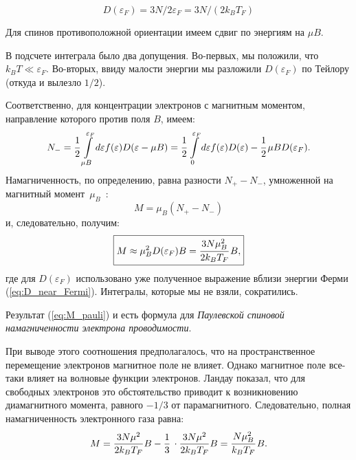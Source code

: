 \documentclass[a4paper, 12pt, openany]{book}
\begin{document}
    \begin{equation}
        D(\varepsilon_{F}) = 3N / 2\varepsilon_{F} = 
        3N / (2k_{B} T_{F})
        \label{eq:D_near_Fermi}
    \end{equation}

    Для спинов противоположной ориентации имеем сдвиг по энергиям на $\mu B$.

    В подсчете интеграла было два допущения.
    Во-первых, мы положили, что $k_{B}T \ll \varepsilon_{F}$.
    Во-вторых, ввиду малости энергии мы разложили $D(\varepsilon_{F})$ по Тейлору (откуда и вылезло $1 / 2$).

    Соответственно, для концентрации электронов с магнитным моментом, направление которого против поля $B$, имеем:
    \begin{equation}
        N_{-} = \cfrac{1}{2}\, \int\limits_{\mu B}^{\varepsilon_{F}} d\varepsilon f(\varepsilon) D(\varepsilon - \mu B) =
        \cfrac{1}{2}\, \int\limits_{0}^{\varepsilon_{F}} d\varepsilon f(\varepsilon) D(\varepsilon) - \cfrac{1}{2}\, \mu B D(\varepsilon_{F}).
        \label{eq:N-}
    \end{equation}
    Намагниченность, по определению, равна разности $N_{+} - N_{-}$, умноженной на магнитный момент~$\mu_{B}$~:
    \begin{equation}
        M = \mu_{B} (N_{+} - N_{-})
        \label{eq:M_definition}
    \end{equation}
    и, следовательно, получим:
    \begin{equation}
        \boxed{
            M \approx \mu_B^2 D(\varepsilon_{F}) B = 
            \cfrac{3 N\mu_B^2}{2k_{B} T_{F}}\, B,
        }
        \label{eq:M_pauli}
    \end{equation}
    где для $D(\varepsilon_F)$ использовано уже полученное выражение вблизи энергии Ферми (\ref{eq:D_near_Fermi}). Интегралы, которые мы не взяли, сократились.

    Результат (\ref{eq:M_pauli}) и есть формула для \textit{Паулевской спиновой намагниченности электрона проводимости}.

    При выводе этого соотношения предполагалось, что на пространственное перемещение электронов магнитное поле не влияет.
    Однако магнитное поле все-таки влияет на волновые функции электронов.
    Ландау показал, что для свободных электронов это обстоятельство приводит к возникновению диамагнитного момента, равного $-1 / 3$ от парамагнитного.
    Следовательно, полная намагниченность электронного газа равна:
    \begin{equation}
        M = \frac{3 N \mu^{2}}{2 k_{B} T_{F}} B - \frac{1}{3}\, \cdot  \frac{3 N \mu^{2}}{2 k_{B} T_{F}} B = 
        \cfrac{N \mu_{B}^2}{k_{B}T_{F}}\, B.
        \label{eq:M_with_landau_total}
    \end{equation}
\end{document}
